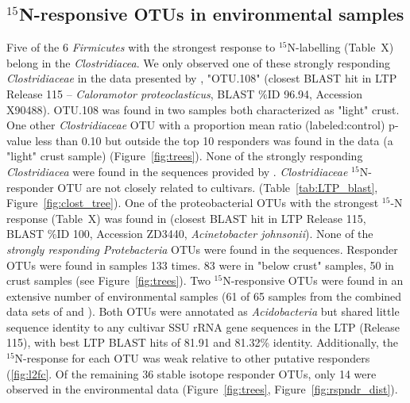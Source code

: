 \subsection{$^{15}$N-responsive OTUs in  environmental samples}
Five of the 6 \textit{Firmicutes} with the strongest response to
$^{15}$N-labelling (Table~X) belong in the \textit{Clostridiacea}. We only
observed one of these strongly responding \textit{Clostridiaceae} in the data
presented by \citet{Garcia_Pichel_2013}, "OTU.108" (closest BLAST hit in LTP
Release 115 -- \textit{Caloramotor proteoclasticus}, BLAST \%ID 96.94,
Accession X90488).  OTU.108 was found in two samples both characterized as
"light" crust. One other \textit{Clostridiaceae} OTU with a proportion mean
ratio (labeled:control) p-value less than 0.10 but outside the top 10
responders was found in the \citet{Garcia_Pichel_2013} data (a "light" crust
sample) (Figure~\ref{fig:trees}).  None of the strongly responding
\textit{Clostridiacea} were found in the sequences provided by
\citet{Steven_2013}. \textit{Clostridiaceae} $^{15}$N-responder OTU are not
closely related to cultivars.  (Table~\ref{tab:LTP_blast},
Figure~\ref{fig:clost_tree}).   One of the proteobacterial OTUs with the
strongest $^{15}$-N response (Table~X) was found in \citet{Garcia_Pichel_2013}
(closest BLAST hit in LTP Release 115, BLAST \%ID 100, Accession ZD3440,
\textit{Acinetobacter johnsonii}). None of the \textit{strongly responding}
\textit{Protebacteria} OTUs were found in the \citet{Steven_2013} sequences.
Responder OTUs were found in \citet{Steven_2013} samples 133 times. 83 were in
"below crust" samples, 50 in crust samples (see Figure~\ref{fig:trees}).  Two
$^{15}$N-responsive OTUs were found in an extensive number of environmental
samples (61 of 65 samples from the combined data sets of
\citet{Garcia_Pichel_2013} and \citet{Steven_2013}).  Both OTUs were annotated
as \textit{Acidobacteria} but shared little sequence identity to any cultivar
SSU rRNA gene sequences in the LTP (Release 115), with best LTP BLAST hits of
81.91 and 81.32\% identity. Additionally, the $^{15}$N-response for each OTU
was weak relative to other putative responders (\ref{fig:l2fc}. Of the
remaining 36 stable isotope responder OTUs, only 14 were observed in the
environmental data (Figure~\ref{fig:trees}, Figure~\ref{fig:rspndr_dist}).

